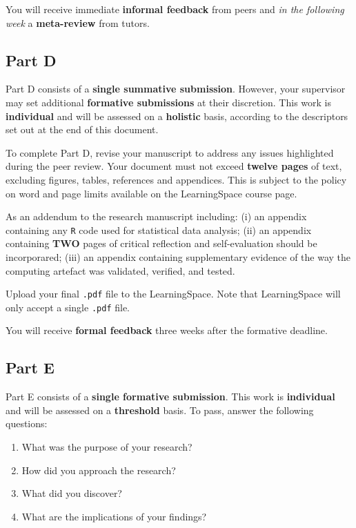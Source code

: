 You will receive immediate \textbf{informal feedback} from peers and \textit{in the following week} a \textbf{meta-review} from tutors.

\subsection*{Part D}

Part D consists of a \textbf{single summative submission}. However, your supervisor may set additional \textbf{formative submissions} at their discretion.
This work is \textbf{individual} and will be assessed on a \textbf{holistic} basis, according to the descriptors set out at the end of this document.

To complete Part D, revise your manuscript to address any issues highlighted during the peer review.
Your document must not exceed \textbf{twelve pages} of text, excluding figures, tables, references and appendices.
This is subject to the policy on word and page limits available on the LearningSpace course page.

As an addendum to the research manuscript including: (i) an appendix containing any \texttt{R} code used for statistical data analysis; (ii) an appendix containing \textbf{TWO} pages of critical reflection and self-evaluation should be incorporared; (iii) an appendix containing supplementary evidence of the way the computing artefact was validated, verified, and tested.

Upload your final \texttt{.pdf} file to the LearningSpace.
Note that LearningSpace will only accept a single \texttt{.pdf} file.

You will receive \textbf{formal feedback} three weeks after the formative deadline.

\subsection*{Part E}

Part E consists of a \textbf{single formative submission}.
This work is \textbf{individual} and will be assessed on a \textbf{threshold} basis.
To pass, answer the following questions:

\begin{enumerate}[label=(\roman*)]
	\item What was the purpose of your research?
	\item How did you approach the research?
	\item What did you discover?
	\item What are the implications of your findings?
\end{enumerate}

